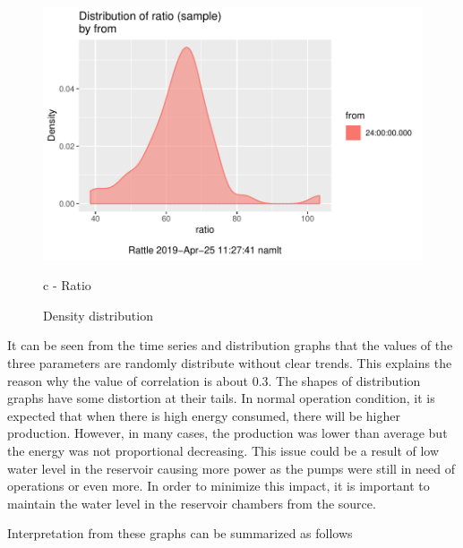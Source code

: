 \begin{figure}[!htb]
\begin{minipage}[b]{0.3\linewidth}
		\includegraphics[width=\textwidth]{figures/distribution_ratio}
		\caption*{c - Ratio}
	\end{minipage}
	\caption{Density distribution}
	\label{ch05_fig_energy_distribution}
\end{figure}

It can be seen from the time series and distribution graphs that the values of the three parameters are randomly distribute without clear trends. This explains the reason why the value of correlation is about 0.3. The shapes of distribution graphs have some distortion at their tails. In normal operation condition, it is expected that when there is high energy consumed, there will be higher production. However, in many cases, the production was lower than average but the energy was not proportional decreasing. This issue could be a result of low water level in the reservoir causing more power as the pumps were still in need of operations or even more. In order to minimize this impact, it is important to maintain the water level in the reservoir chambers from the source.





Interpretation from these graphs can be summarized as follows

